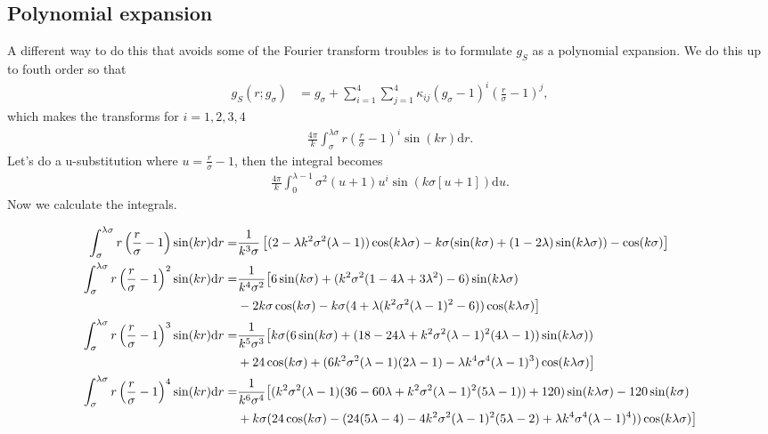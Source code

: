 \documentclass[letterpaper,twocolumn,amsmath,amssymb,pre,aps,10pt]{revtex4-1}
\begin{document}
\subsection{Polynomial expansion}

A different way to do this that avoids some of the Fourier transform
troubles is to formulate $g_S$ as a polynomial expansion.  We do this
up to fouth order so that
\begin{align}
  g_S(r;g_\sigma) &=
  g_\sigma + \sum_{i=1}^{4} \sum_{j=1}^{4} \kappa_{ij} (g_\sigma - 1)^i
  \left(\frac{r}{\sigma}-1\right)^j,
  \label{eq:fit-form}
\end{align}
which makes the transforms for $i=1,2,3,4$
\begin{align}
 \frac {4\pi}{k}\int_\sigma^{\lambda \sigma} r
 \left( \frac{r}{\sigma}-1\right)^i \sin (kr) \mathrm{d}r.
\end{align}
Let's do a u-substitution where $u= \frac{r}{\sigma}-1$, then the
integral becomes
\begin{align}
 \frac {4\pi}{k}\int_0^{\lambda -1} \sigma^2 (u+1)u^i \sin(k\sigma
       [u+1]) \mathrm{d}u.
\end{align}
Now we calculate the integrals.
\begin{widetext}
\begin{align}
  \int_\sigma^{\lambda \sigma} r
 \left( \frac{r}{\sigma}-1\right) \sin (kr) \mathrm{d}r =&
 \frac{1}{k^3 \sigma}\left[(2-\lambda k^2
 \sigma^2(\lambda-1))\cos(k\lambda\sigma)-k\sigma(\sin(k\sigma)
 +(1-2\lambda) \sin(k\lambda\sigma)) -\cos(k\sigma) \right] \\
  \int_\sigma^{\lambda \sigma} r
 \left( \frac{r}{\sigma}-1\right)^2 \sin (kr) \mathrm{d}r =&
 \frac{1}{k^4\sigma^2} \big[
 6\sin(k\sigma)+(k^2\sigma^2(1-4\lambda+3\lambda^2)
 -6)\sin(k\lambda\sigma) \notag \\
 &-2k\sigma\cos(k\sigma) - k\sigma(4 +
 \lambda(k^2\sigma^2(\lambda-1)^2 - 6))\cos(k\lambda\sigma)\big] \\
  \int_\sigma^{\lambda \sigma} r
 \left( \frac{r}{\sigma}-1\right)^3 \sin (kr) \mathrm{d}r =&
 \frac{1}{k^5\sigma^3} \big[k\sigma(6\sin(k\sigma) + (18-24\lambda
   +k^2\sigma^2(\lambda-1)^2(4\lambda-1))\sin(k\lambda\sigma)) \notag \\
   &+24\cos(k\sigma) + (6k^2\sigma^2(\lambda-1)(2\lambda-1)-\lambda
   k^4\sigma^4(\lambda-1)^3)\cos(k\lambda\sigma)\big] \\
  \int_\sigma^{\lambda \sigma} r
 \left( \frac{r}{\sigma}-1\right)^4 \sin (kr) \mathrm{d}r =&
 \frac{1}{k^6\sigma^4}
 \big[(k^2\sigma^2(\lambda-1)(36-60\lambda+k^2\sigma^2(\lambda - 1)^2(5\lambda-1))
   + 120)\sin(k\lambda\sigma) - 120\sin(k\sigma) \notag \\
   &+k\sigma(24\cos(k\sigma) -
   (24(5\lambda-4)-4k^2\sigma^2(\lambda-1)^2 (5\lambda-2) +
   \lambda k^4\sigma^4(\lambda-1)^4))\cos(k\lambda\sigma) \big]
\end{align}
\end{widetext}
\end{document}
